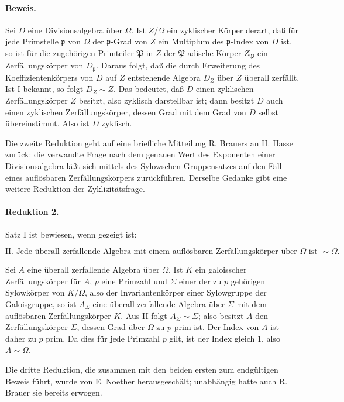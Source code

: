 \documentclass[11pt]{article}
\providecommand{\Om}{\Omega}
\begin{document}
\paragraph{Beweis.}
Sei \(D\) eine Divisionsalgebra über \(\Om\). Ist \(Z/\Om\) ein zyklischer Körper derart, daß für jede Primstelle \(\mathfrak p\) von \(\Om\) der \(\mathfrak p\)-Grad von \(Z\) ein Multiplum des \(\mathfrak p\)-Index von \(D\) ist, so ist für die zugehörigen Primteiler \(\mathfrak P\) in \(Z\) der \(\mathfrak P\)-adische Körper \(Z_{\mathfrak P}\) ein Zerfällungskörper von \(D_{\mathfrak p}\). Daraus folgt, daß die durch Erweiterung des Koeffizientenkörpers von \(D\) auf \(Z\) entstehende Algebra \(D_Z\) über \(Z\) überall zerfällt. Ist I bekannt, so folgt \(D_Z\sim Z\). Das bedeutet, daß \(D\) einen zyklischen Zerfällungskörper \(Z\) besitzt, also zyklisch darstellbar ist; dann besitzt \(D\) auch einen zyklischen Zerfällungskörper, dessen Grad mit dem Grad von \(D\) selbst übereinstimmt. Also ist \(D\) zyklisch.

Die zweite Reduktion geht auf eine briefliche Mitteilung R. Brauers an H. Hasse zurück: die verwandte Frage nach dem genauen Wert des Exponenten einer Divisionsalgebra läßt sich mittels des Sylowschen Gruppensatzes auf den Fall eines auflösbaren Zerfällungskörpers zurückführen. Derselbe Gedanke gibt eine weitere Reduktion der Zyklizitätsfrage.

\paragraph{Reduktion 2.}
Satz I ist bewiesen, wenn gezeigt ist:

\[
\text{II. Jede überall zerfallende Algebra mit einem auflösbaren Zerfällungskörper über }\Om
\text{ ist } \sim\Om .
\]

Sei \(A\) eine überall zerfallende Algebra über \(\Om\). Ist \(K\) ein galoisscher Zerfällungskörper für \(A\), \(p\) eine Primzahl und \(\Sigma\) einer der zu \(p\) gehörigen Sylowkörper von \(K/\Om\), also der Invariantenkörper einer Sylowgruppe der Galoisgruppe, so ist \(A_\Sigma\) eine überall zerfallende Algebra über \(\Sigma\) mit dem auflösbaren Zerfällungskörper \(K\). Aus II folgt \(A_\Sigma\sim\Sigma\); also besitzt \(A\) den Zerfällungskörper \(\Sigma\), dessen Grad über \(\Om\) zu \(p\) prim ist. Der Index von \(A\) ist daher zu \(p\) prim. Da dies für jede Primzahl \(p\) gilt, ist der Index gleich \(1\), also \(A\sim\Om\).

Die dritte Reduktion, die zusammen mit den beiden ersten zum endgültigen Beweis führt, wurde von E. Noether herausgeschält; unabhängig hatte auch R. Brauer sie bereits erwogen.
\end{document}
